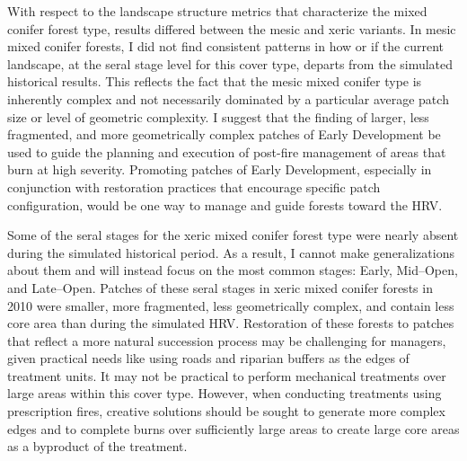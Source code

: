 With respect to the landscape structure metrics that characterize the mixed conifer forest type, results differed between the mesic and xeric variants. In mesic mixed conifer forests, I did not find consistent patterns in how or if the current landscape, at the seral stage level for this cover type, departs from the simulated historical results. This reflects the fact that the mesic mixed conifer type is inherently complex and not necessarily dominated by a particular average patch size or level of geometric complexity. I suggest that the finding of larger, less fragmented, and more geometrically complex patches of Early Development be used to guide the planning and execution of post-fire management of areas that burn at high severity. Promoting patches of Early Development, especially in conjunction with restoration practices that encourage specific patch configuration, would be one way to manage and guide forests toward the HRV.

Some of the seral stages for the xeric mixed conifer forest type were nearly absent during the simulated historical period. As a result, I cannot make generalizations about them and will instead focus on the most common stages: Early, Mid--Open, and Late--Open. Patches of these seral stages in xeric mixed conifer forests in 2010 were smaller, more fragmented, less geometrically complex, and contain less core area than during the simulated HRV. 
%
Restoration of these forests to patches that reflect a more natural succession process may be challenging for managers, given practical needs like using roads and riparian buffers as the edges of treatment units. It may not be practical to perform mechanical treatments over large areas within this cover type. However, when conducting treatments using prescription fires, creative solutions should be sought to generate more complex edges and to complete burns over sufficiently large areas to create large core areas as a byproduct of the treatment.












